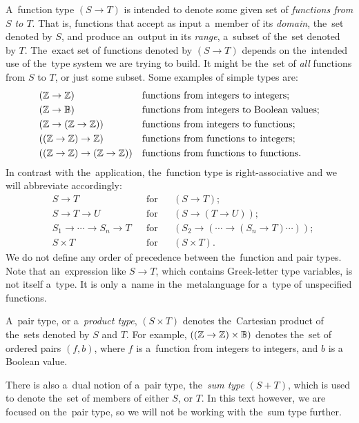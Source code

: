 A~function type $(S \to T)$ is intended to denote some given set of
\emph{functions from $S$ to $T$}. That is, functions that accept as input
a~member of its \emph{domain}, the~set denoted by $S$, and produce an~output in
its \emph{range}, a~subset of the~set denoted by $T$. The~exact set of functions
denoted by $(S \to T)$ depends on the~intended use of the~type system we are
trying to build. It might be the~set of \emph{all} functions from $S$ to $T$, or
just some subset. Some examples of simple types are:
\begin{align*}
  &(\mathbb{Z} \to \mathbb{Z}) && \text{functions from integers to integers;} \\
  &(\mathbb{Z} \to \mathbb{B}) && \text{functions from integers to Boolean values;} \\
  &(\mathbb{Z} \to (\mathbb{Z} \to \mathbb{Z})) && \text{functions from integers to functions;} \\
  &((\mathbb{Z} \to \mathbb{Z}) \to \mathbb{Z}) && \text{functions from functions to integers;} \\
  &((\mathbb{Z} \to \mathbb{Z}) \to (\mathbb{Z} \to \mathbb{Z})) && \text{functions from functions to
    functions.}
\end{align*}
In contrast with the~\lt application, the~function type is right-associative
and we will abbreviate accordingly:
\begin{align*}
  &S \to T  &  &\text{for} &  &(S \to T); \\
  &S \to T \to U  &  &\text{for} &  &(S \to (T \to U)); \\
  &S_1 \to \dotsb \to S_n \to T  &  &\text{for} &
    &(S_2 \to ( \dotsb \to (S_n \to T) \dotsb )); \\
  &S \times T  &  &\text{for} &  &(S \times T).
\end{align*}
We do not define any order of precedence between the~function and pair types.
Note that an~expression like $S \to T$, which contains Greek-letter type
variables, is not itself a~type. It is only a~name in the~metalanguage for
a~type of unspecified functions.

A~pair type, or a~\emph{product type}, $(S \times T)$ denotes the~Cartesian
product of the~sets denoted by $S$ and $T$. For example, $((\mathbb{Z} \to \mathbb{Z})
\times \mathbb{B})$ denotes the~set of ordered pairs $(f, b)$, where $f$ is
a~function from integers to integers, and $b$ is a Boolean value.

There is also a~dual notion of a~pair type, the~\emph{sum type} $(S + T)$, which
is used to denote the~set of members of either $S$, or $T$. In this text
however, we are focused on the~pair type, so we will not be working with the~sum
type further.

